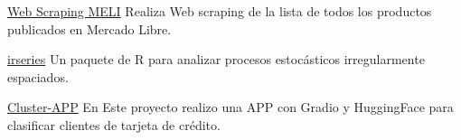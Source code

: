 {}
{\href{https://github.com/Wilmar3752/meli_scrapper}{Web Scraping MELI}}
{Realiza Web scraping de la lista de todos los productos publicados en Mercado Libre.}
{\jbegin
\jend}

{}
{\href{https://github.com/Wilmar3752/itseries}{irseries}}
{Un paquete de R para analizar procesos estocásticos irregularmente espaciados.}
{\jbegin
\jend}

{}
{\href{https://github.com/Wilmar3752/cluster-app}{Cluster-APP}}
{En Este proyecto realizo una APP con Gradio y HuggingFace para clasificar clientes de tarjeta de crédito.}
{\jbegin
\jend}








